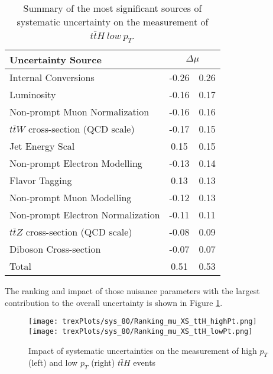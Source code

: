 \begin{table}[H]
    \centering
    \begin{tabular}{l|cc}
        \hline\hline
        Uncertainty Source & \multicolumn{2}{c}{$\Delta \mu$ }  \\
        \hline
        Internal Conversions & -0.26 & 0.26 \\
        Luminosity & -0.16 & 0.17 \\
        Non-prompt Muon Normalization & -0.16 & 0.16 \\
        $t\bar{t}W$ cross-section (QCD scale) & -0.17 & 0.15 \\
        Jet Energy Scal & 0.15 & 0.15 \\
        Non-prompt Electron Modelling & -0.13 & 0.14 \\
        Flavor Tagging & 0.13 & 0.13 \\
        Non-prompt Muon Modelling & -0.12 & 0.13 \\
        Non-prompt Electron Normalization & -0.11 & 0.11 \\
        $t\bar{t}Z$ cross-section (QCD scale) & -0.08 & 0.09 \\
        Diboson Cross-section & -0.07 & 0.07 \\
        \hline           
        Total & 0.51 & 0.53 \\
        \hline\hline
    \end{tabular}
    \caption{Summary of the most significant sources of systematic uncertainty on the measurement of $t\bar{t}H\ low\ p_T$.}
    \label{tab:systematics_low_80}
\end{table}

The ranking and impact of those nuisance parameters with the largest contribution to the overall uncertainty is shown in Figure \ref{fig:ranking_80}.

\begin{figure}[H]
    \centering
    \texttt{[image: trexPlots/sys\_80/Ranking\_mu\_XS\_ttH\_highPt.png]}%
    \texttt{[image: trexPlots/sys\_80/Ranking\_mu\_XS\_ttH\_lowPt.png]}
    \caption{Impact of systematic uncertainties on the measurement of high $p_T$ (left) and low $p_T$ (right) $t\bar{t}H$ events}
    \label{fig:ranking_80}
\end{figure}


